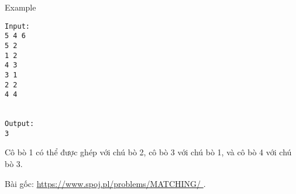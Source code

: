 Example
\begin{verbatim}
Input:
5 4 6
5 2
1 2
4 3
3 1
2 2
4 4


Output:
3

\end{verbatim}

   Cô bò 1 có thể được ghép với chú bò 2, cô bò 3 với chú bò 1, và cô bò 4 với chú bò 3.  

   Bài gốc:   \href{https://www.spoj.pl/problems/MATCHING/}{    https://www.spoj.pl/problems/MATCHING/   }   .